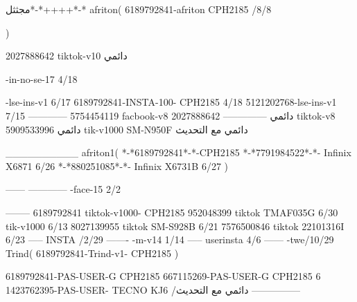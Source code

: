 مجثثل*-*++++*-*
afriton(
6189792841-afriton CPH2185  /8/8

)

2027888642 tiktok-v10
دائمي

-in-no-se-17 4/18

-lse-ins-v1 6/17
6189792841-INSTA-100- CPH2185 4/18
5121202768-lse-ins-v1 7/15
------------
5754454119 facbook-v8
دائمي
--------------
2027888642 tiktok-v8
دائمي
5909533996 tik-v1000  SM-N950F
دائمي مع التحديث

__________
afriton1(
*-*6189792841*-*-CPH2185
*-*7791984522*-*- Infinix X6871  6/26
*-*880251085*-*-  Infinix X6731B  6/27
)


------
------------
-face-15 2/2

--------
6189792841 tiktok-v1000- CPH2185 
952048399 tiktok TMAF035G  6/30
 tik-v1000   6/13
8027139955 tiktok SM-S928B  6/21
7576500846 tiktok 22101316I  6/23
-----
 INSTA /2/29
-------
-m-v14 1/14
-----
userinsta 4/6
------
-twe/10/29
Trind(
6189792841-Trind-v1- CPH2185 
)


6189792841-PAS-USER-G CPH2185 
667115269-PAS-USER-G CPH2185 6
1423762395-PAS-USER- TECNO KJ6  /دائمي مع التحديث
    ---------------
